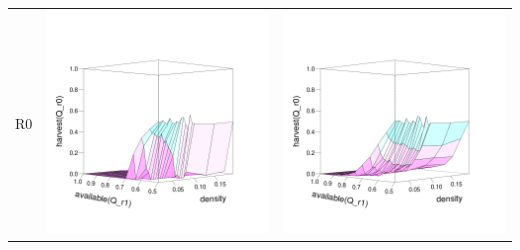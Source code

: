 \documentclass[a4paper,10pt]{article}
\begin{document}
\begin{table}[H]
\begin{tabular}{lcc}
R0 & \includegraphics[width=\imgSize]{images/R0_median}&\includegraphics[width=\imgSize]{images/R0_mean}\\

\end{tabular}
\end{table}
\end{document}
